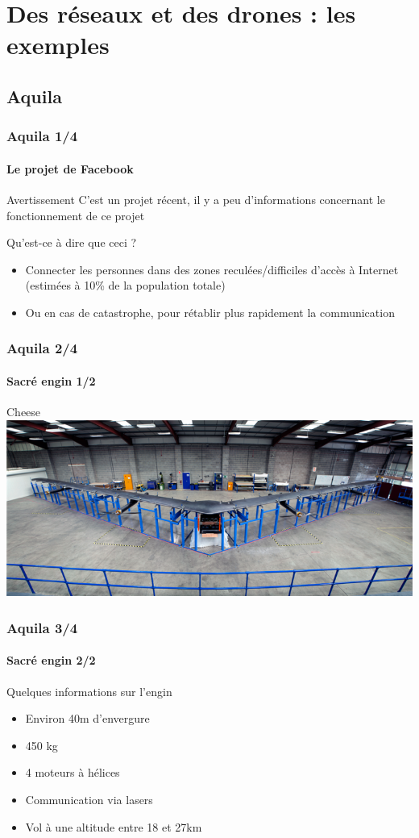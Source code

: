 \documentclass{beamer}
\begin{document}
\section{Des réseaux et des drones : les exemples}
\begin{frame}
	\tableofcontents[currentsection]
\end{frame}

\subsection{Aquila}
\begin{frame}
  \frametitle{Aquila 1/4}
  \framesubtitle{Le projet de Facebook}
  \begin{alertblock}{Avertissement}
    C'est un projet récent, il y a peu d'informations concernant le fonctionnement de ce projet
  \end{alertblock}
  \begin{block}{Qu'est-ce à dire que ceci ?}
    \begin{itemize}
      \item Connecter les personnes dans des zones reculées/difficiles d'accès à Internet (estimées à 10\% de la population totale)
      \item Ou en cas de catastrophe, pour rétablir plus rapidement la communication
    \end{itemize}
  \end{block}
\end{frame}

\begin{frame}
  \frametitle{Aquila 2/4}
  \framesubtitle{Sacré engin 1/2}
  \begin{block}{Cheese}
      \includegraphics[width=\textwidth]{../Images/facebook_aquila.png}
  \end{block}
\end{frame}

\begin{frame}
  \frametitle{Aquila 3/4}
  \framesubtitle{Sacré engin 2/2}
  \begin{block}{Quelques informations sur l'engin}
    \begin{itemize}
      \item Environ 40m d'envergure
      \item 450 kg
      \item 4 moteurs à hélices
      \item Communication via lasers
      \item Vol à une altitude entre 18 et 27km
    \end{itemize}
  \end{block}
\end{frame}
\end{document}
